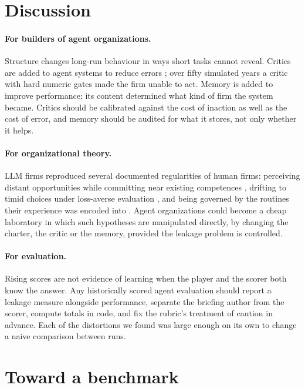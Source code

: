 \documentclass[11pt]{article}
\theoremstyle{definition}
\begin{document}
\section{Discussion}

\paragraph{For builders of agent organizations.} Structure changes long-run behaviour in ways short tasks cannot reveal. Critics are added to agent systems to reduce errors \citep{du2024debate,liang2024divergent}; over fifty simulated years a critic with hard numeric gates made the firm unable to act. Memory is added to improve performance; its content determined what kind of firm the system became. Critics should be calibrated against the cost of inaction as well as the cost of error, and memory should be audited for what it stores, not only whether it helps.

\paragraph{For organizational theory.} LLM firms reproduced several documented regularities of human firms: perceiving distant opportunities while committing near existing competences \citep{cohen1990absorptive,march1991exploration}, drifting to timid choices under loss-averse evaluation \citep{kahneman1993timid}, and being governed by the routines their experience was encoded into \citep{levitt1988organizational}. Agent organizations could become a cheap laboratory in which such hypotheses are manipulated directly, by changing the charter, the critic or the memory, provided the leakage problem is controlled.

\paragraph{For evaluation.} Rising scores are not evidence of learning when the player and the scorer both know the answer. Any historically scored agent evaluation should report a leakage measure alongside performance, separate the briefing author from the scorer, compute totals in code, and fix the rubric's treatment of caution in advance. Each of the distortions we found was large enough on its own to change a naive comparison between runs.

\section{Toward a benchmark}
\label{sec:benchmark}
\end{document}
